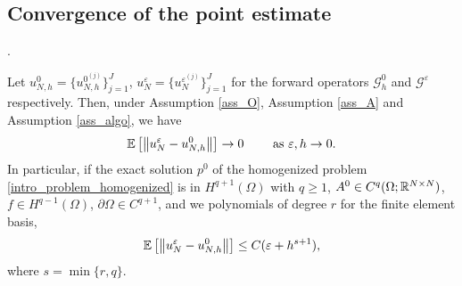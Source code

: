\documentclass[10pt]{article}
\begin{document}
\subsection{Convergence of the point estimate}

.
\begin{theorem} \label{convergence_result_full}
Let $u_{N,h}^0 = \{ u_{N,h}^{0^{(j)}} \}_{j=1}^J$, $u_N^{\varepsilon} = \{ u_N^{\varepsilon^{(j)}} \}_{j=1}^J$  for the forward operators $\mathcal{G}^0_h$ and $\mathcal{G}^{\varepsilon}$ respectively. 
Then, under Assumption \ref{ass_O}, Assumption \ref{ass_A} and Assumption \ref{ass_algo}, we have
\begin{equation*}
\mathbb{E} \left [ \left\|u_N^{\varepsilon} - u_{N,h}^0\right\| \right ] \to 0 \qquad \text{ as } \varepsilon, h \to 0.
\end{equation*}
In particular, if the exact solution $p^0$ of the homogenized problem \eqref{intro_problem_homogenized} is in $H^{q+1}(\Omega)$ with $q \ge 1$, $A^0 \in C^q(\Omega;\mathbb{R}^{N \times N})$, $f \in H^{q-1}(\Omega)$, $\partial \Omega \in C^{q+1}$, and we  polynomials of degree $r$ for the finite element basis, 
\begin{equation*}
\mathbb{E} \left [ \left\|u_N^{\varepsilon} - u_{N,h}^0\right\| \right ] \le C ( \varepsilon + h^{s+1} ),
\end{equation*} 
where $s = \min \{ r, q \}$.
\end{theorem}
\end{document}
